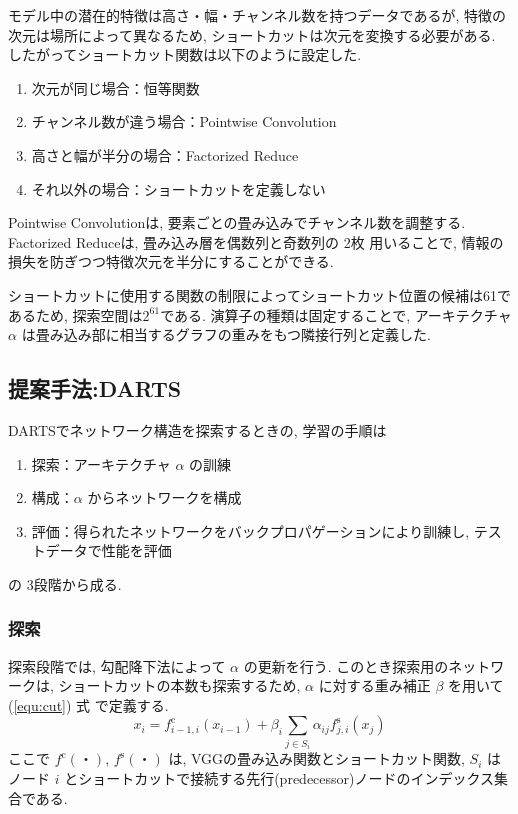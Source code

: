 モデル中の潜在的特徴は高さ・幅・チャンネル数を持つデータであるが,
特徴の次元は場所によって異なるため, ショートカットは次元を変換する必要がある.
したがってショートカット関数は以下のように設定した.
\begin{enumerate}
  \item 次元が同じ場合：恒等関数
  \item チャンネル数が違う場合：Pointwise Convolution
  \item 高さと幅が半分の場合：Factorized Reduce
  \item それ以外の場合：ショートカットを定義しない
\end{enumerate}
Pointwise Convolutionは, 要素ごとの畳み込みでチャンネル数を調整する.
Factorized Reduceは, 畳み込み層を偶数列と奇数列の 2枚 用いることで, 情報の損失を防ぎつつ特徴次元を半分にすることができる.

ショートカットに使用する関数の制限によってショートカット位置の候補は61であるため,
探索空間は$2^{61}$である.
演算子の種類は固定することで, アーキテクチャ $\alpha$ は畳み込み部に相当するグラフの重みをもつ隣接行列と定義した.


\changeindent{0cm}
\subsection{提案手法:DARTS}
\label{sec:pred.01}
\changeindent{2cm}

DARTSでネットワーク構造を探索するときの, 学習の手順は
\begin{enumerate}
  \item 探索：アーキテクチャ $\alpha$ の訓練
  \item 構成：$\alpha$ からネットワークを構成
  \item 評価：得られたネットワークをバックプロパゲーションにより訓練し, テストデータで性能を評価
\end{enumerate}
の 3段階から成る.

\subsubsection{探索}

探索段階では, 勾配降下法によって $\alpha$ の更新を行う.
このとき探索用のネットワークは, ショートカットの本数も探索するため,
$\alpha$ に対する重み補正 $\beta$ を用いて (\ref{equ:cut}) 式 で定義する.
\begin{equation}
  \label{equ:cut}
  x_i = f^{\mathrm{c}}_{i-1, i}(x_{i-1}) + \beta_i \sum_{j \in S_i} \alpha_{ij} f^{\mathrm{s}}_{j, i} (x_j)
\end{equation}
ここで $f^{\mathrm{c}}(・)$, $f^{\mathrm{s}}(・)$ は, VGGの畳み込み関数とショートカット関数,
$S_i$ はノード $i$ とショートカットで接続する先行(predecessor)ノードのインデックス集合である.

